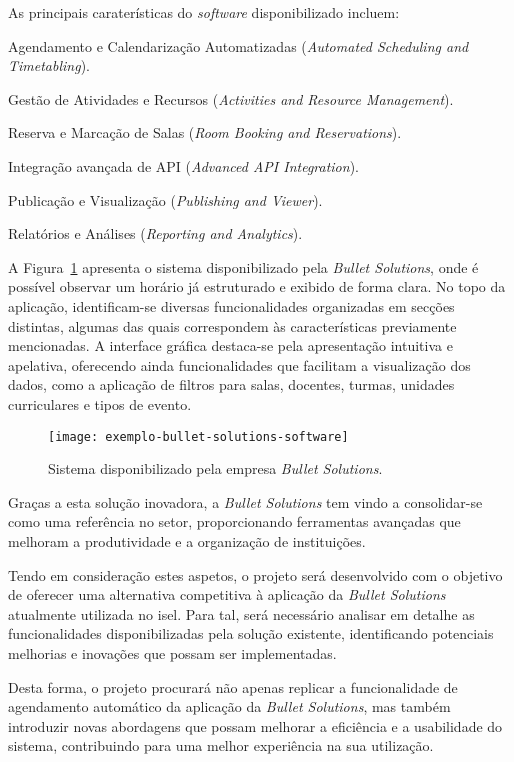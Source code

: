 As principais caraterísticas do \textit{software} disponibilizado incluem:

\begin{compactitem}
    \item Agendamento e Calendarização Automatizadas (\textit{Automated Scheduling and Timetabling}).
    \item Gestão de Atividades e Recursos (\textit{Activities and Resource Management}).
    \item Reserva e Marcação de Salas (\textit{Room Booking and Reservations}).
    \item Integração avançada de API (\textit{Advanced API Integration}).
    \item Publicação e Visualização (\textit{Publishing and Viewer}).
    \item Relatórios e Análises (\textit{Reporting and Analytics}).
\end{compactitem}

A Figura~\ref{fig:software-bullet-solutions} apresenta o sistema disponibilizado pela \textit{Bullet Solutions}, onde é possível observar um horário já estruturado e exibido de forma clara. No topo da aplicação, identificam-se diversas funcionalidades organizadas em secções distintas, algumas das quais correspondem às características previamente mencionadas. A interface gráfica destaca-se pela apresentação intuitiva e apelativa, oferecendo ainda funcionalidades que facilitam a visualização dos dados, como a aplicação de filtros para salas, docentes, turmas, unidades curriculares e tipos de evento.

\begin{figure}[H]
    \centering
    \texttt{[image: exemplo-bullet-solutions-software]}
    \caption{Sistema disponibilizado pela empresa \textit{Bullet Solutions}.}
    \label{fig:software-bullet-solutions}
\end{figure}

Graças a esta solução inovadora, a \textit{Bullet Solutions} tem vindo a consolidar-se como uma referência no setor, proporcionando ferramentas avançadas que melhoram a produtividade e a organização de instituições.

Tendo em consideração estes aspetos, o projeto será desenvolvido com o objetivo de oferecer uma alternativa competitiva à aplicação da \textit{Bullet Solutions} atualmente utilizada no \gls{isel}. Para tal, será necessário analisar em detalhe as funcionalidades disponibilizadas pela solução existente, identificando potenciais melhorias e inovações que possam ser implementadas.

Desta forma, o projeto procurará não apenas replicar a funcionalidade de agendamento automático da aplicação da \textit{Bullet Solutions}, mas também introduzir novas abordagens que possam melhorar a eficiência e a usabilidade do sistema, contribuindo para uma melhor experiência na sua utilização.
